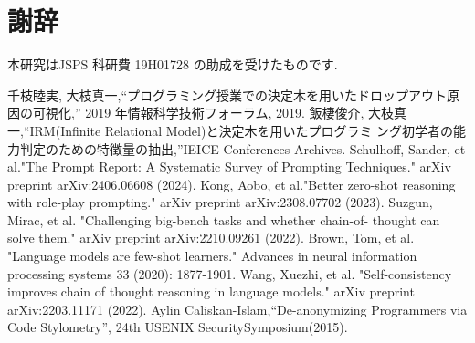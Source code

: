 \documentclass[11pt]{jreport}
\begin{document}
\chapter*{謝辞}
本研究はJSPS 科研費 19H01728 の助成を受けたものです.
\begin{thebibliography}{9}
  \renewcommand{\baselinestretch}{1.0}
  千枝睦実, 大枝真一,“プログラミング授業での決定木を用いたドロップアウト原因の可視化,” 2019 年情報科学技術フォーラム, 2019.
  飯棲俊介, 大枝真一,“IRM(Infinite Relational Model)と決定木を用いたプログラミ ング初学者の能力判定のための特徴量の抽出,”IEICE Conferences Archives.
  Schulhoff, Sander, et al."The Prompt Report: A Systematic Survey of Prompting Techniques." arXiv preprint arXiv:2406.06608 (2024).
  Kong, Aobo, et al."Better zero-shot reasoning with role-play prompting." arXiv preprint arXiv:2308.07702 (2023).
  Suzgun, Mirac, et al. "Challenging big-bench tasks and whether chain-of- thought can solve them." arXiv preprint arXiv:2210.09261 (2022).
  Brown, Tom, et al. "Language models are few-shot learners." Advances in neural information processing systems 33 (2020): 1877-1901.
   Wang, Xuezhi, et al. "Self-consistency improves chain of thought reasoning in language models." arXiv preprint arXiv:2203.11171 (2022).
  Aylin Caliskan-Islam,“De-anonymizing Programmers via Code Stylometry”, 24th USENIX SecuritySymposium(2015).
  
\end{thebibliography}

\end{document}
